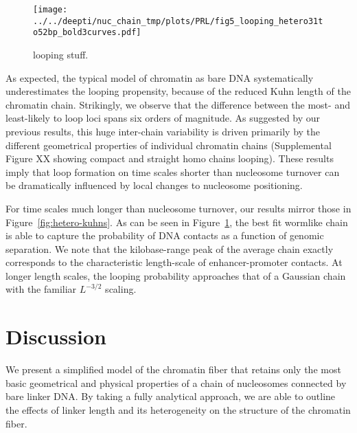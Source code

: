 \documentclass[%
 reprint,
superscriptaddress,
showpacs,preprintnumbers,
 amsmath,amssymb,
 aps,
 prl,
]{revtex4-1}
\begin{document}
\begin{figure}
    \centering
    \texttt{[image: ../../deepti/nuc\_chain\_tmp/plots/PRL/fig5\_looping\_hetero31to52bp\_bold3curves.pdf]}
    \caption{looping stuff.}\label{fig:looping}
\end{figure}

As expected, the typical model of chromatin as bare DNA systematically
    underestimates the looping propensity, because of the reduced Kuhn length of
    the chromatin chain.
Strikingly, we observe that the difference between the most- and least-likely to
    loop loci spans six orders of magnitude.
As suggested by our previous results, this huge inter-chain variability is
    driven primarily by the different geometrical properties of individual
    chromatin chains (Supplemental Figure XX showing compact and straight homo chains
    looping).
These results imply that loop formation on time scales shorter than nucleosome
    turnover can be dramatically influenced by local changes to nucleosome
    positioning.

For time scales much longer than nucleosome turnover, our results mirror those
    in Figure~\ref{fig:hetero-kuhns}.
As can be seen in Figure~\ref{fig:looping}, the best fit wormlike chain is able
    to capture the probability of DNA contacts as a function of genomic separation.
We note that the kilobase-range peak of the average chain exactly corresponds to
    the characteristic length-scale of enhancer-promoter contacts.
At longer length scales, the looping probability approaches that of a Gaussian
    chain with the familiar $L^{-3/2}$ scaling.

\section{\label{sec:discussion}Discussion}

We present a simplified model of the chromatin fiber that retains only the most
    basic geometrical and physical properties of a chain of nucleosomes
    connected by bare linker DNA.\@
By taking a fully analytical approach, we are able to outline the effects of
    linker length and its heterogeneity on the structure of the chromatin fiber.
\end{document}
